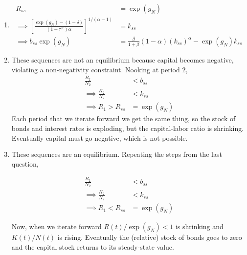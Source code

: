 \documentclass[11pt]{article}
\begin{document}
  \begin{enumerate}[label=\alph*)]
\item 
\begin{align*}
R_{ss} &= \exp(g_N)\\
\implies \left[\frac{\exp (g_N) - (1 - \delta)}{(1 - \tau^K)\alpha}\right]^{1/(\alpha - 1)} &= k_{ss}\\
\implies b_{ss} \exp(g_N) &= \frac{\beta}{1 + \beta} (1 - \alpha) (k_{ss})^\alpha - \exp(g_N) k_{ss}
\end{align*}
\item These sequences are not an equilibrium because capital becomes negative, violating a non-negativity constraint. Nooking at period 2,
\begin{align*}
\frac{B_2}{N_2} &< b_{ss} \\
\implies \frac{K_2}{N_2} &< k_{ss}\\
\implies R_1 > R_{ss} &= \exp(g_N)
\end{align*}
Each period that we iterate forward we get the same thing, so the stock of bonds and interest rates is exploding, but the capital-labor ratio is shrinking. Eventually capital must go negative, which is not possible.

\item
These sequences are an equilibrium. Repeating the steps from the last question,

\begin{align*}
\frac{B_2}{N_2} &< b_{ss}\\
\implies \frac{K_2}{N_2} &< k_{ss}\\
\implies R_1 < R_{ss} &= \exp(g_N)
\end{align*}

Now, when we iterate forward $R(t)/\exp(g_N) < 1$ is shrinking and $K(t)/N(t)$ is rising. Eventually the (relative) stock of bonds goes to zero and the capital stock returns to its steady-state value.
  \end{enumerate}
\end{document}
